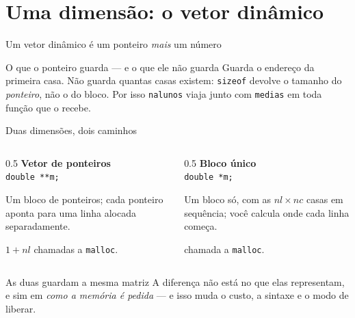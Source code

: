 \documentclass[aspectratio=169]{beamer}
\begin{document}
\section{Uma dimensão: o vetor dinâmico}

\begin{frame}{Um vetor dinâmico é um ponteiro \emph{mais} um número}
  \begin{center}
  \end{center}
  \begin{block}{O que o ponteiro guarda --- e o que ele não guarda}
    Guarda o endereço da primeira casa. Não guarda quantas casas existem:
    \texttt{sizeof} devolve o tamanho do \emph{ponteiro}, não o do bloco.
    Por isso \texttt{nalunos} viaja junto com \texttt{medias} em toda função
    que o recebe.
  \end{block}
\end{frame}

\begin{frame}{Duas dimensões, dois caminhos}
  \begin{columns}[T]
    \begin{column}{0.5\textwidth}
      \textbf{Vetor de ponteiros}\\[0.3em]
      \texttt{double **m;}

      \medskip
      Um bloco de ponteiros; cada ponteiro aponta para uma linha alocada
      separadamente.

      \medskip
      $1 + nl$ chamadas a \texttt{malloc}.
    \end{column}
    \begin{column}{0.5\textwidth}
      \textbf{Bloco único}\\[0.3em]
      \texttt{double *m;}

      \medskip
      Um bloco só, com as $nl \times nc$ casas em sequência; você calcula onde
      cada linha começa.

       chamada a \texttt{malloc}.
    \end{column}
  \end{columns}
  \begin{block}{As duas guardam a mesma matriz}
    A diferença não está no que elas representam, e sim em \emph{como a
    memória é pedida} --- e isso muda o custo, a sintaxe e o modo de liberar.
  \end{block}
\end{frame}
\end{document}
